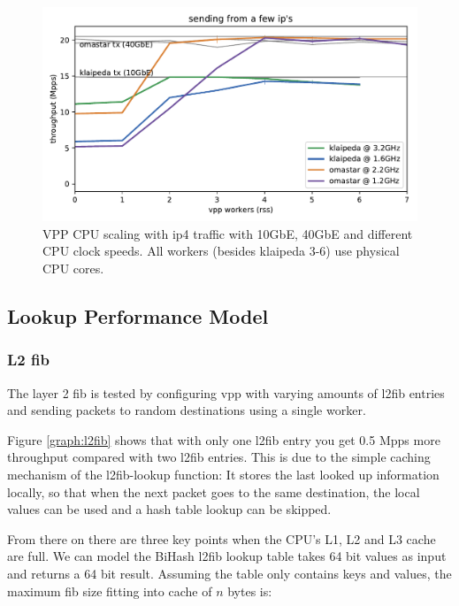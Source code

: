 \begin{figure}[!ht]
\noindent\hspace{0.5mm}\includegraphics[width=\linewidth]{pics/throughput_summary_multicore.pdf}
\caption{VPP CPU scaling with \Ac{ip4} traffic with 10GbE, 40GbE and different CPU clock speeds. All workers (besides klaipeda 3-6) use physical CPU cores. }
\label{graph:multicore}
\end{figure}


\subsection{Lookup Performance Model}



\subsubsection{L2 \Ac{fib}}

The layer 2 \Ac{fib} is tested by configuring \Ac{vpp} with varying
amounts of l2fib entries and sending packets to random destinations
using a single worker.

Figure \ref{graph:l2fib} shows that with only one l2fib entry you get
0.5 Mpps more throughput compared with two l2fib entries. This is due
to the simple caching mechanism of the l2fib-lookup function: It
stores the last looked up information locally, so that when the next
packet goes to the same destination, the local values can be used and
a hash table lookup can be skipped.

From there on there are three key points when the CPU's L1, L2 and L3
cache are full. We can model the BiHash l2fib lookup table takes 64
bit values as input and returns a 64 bit result. Assuming the table
only contains keys and values, the maximum \Ac{fib} size fitting into
cache of $n$ bytes is:

